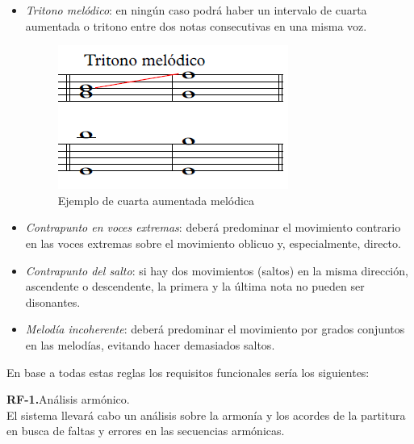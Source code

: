 \begin{itemize}
	\item \textit{Tritono melódico}: en ningún caso podrá haber un intervalo de cuarta aumentada o tritono entre dos notas consecutivas en una misma voz.

	\begin{figure}[H]
		\centering
		\includegraphics[scale=0.7]{imagenes/tritonomel.png}
		\caption{Ejemplo de cuarta aumentada melódica}
		\label{fig2.1.11}
	\end{figure}

	\item \textit{Contrapunto en voces extremas}: deberá predominar el movimiento contrario en las voces extremas sobre el movimiento oblicuo y, especialmente, directo.

	\item \textit{Contrapunto del salto}: si hay dos movimientos (saltos) en la misma dirección, ascendente o descendente, la primera y la última nota no pueden ser disonantes.

	\item \textit{Melodía incoherente}: deberá predominar el movimiento por grados conjuntos en las melodías, evitando hacer demasiados saltos.

\end{itemize}

\bigskip
\bigskip

En base a todas estas reglas los requisitos funcionales sería los siguientes:

\textbf{RF-1.}Análisis armónico. \\
El sistema llevará cabo un análisis sobre la armonía y los acordes de la partitura en busca de faltas y errores en las secuencias armónicas.

